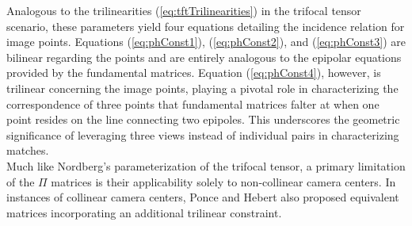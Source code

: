 Analogous to the trilinearities (\ref{eq:tftTrilinearities}) in the trifocal tensor scenario, these parameters yield four equations detailing the incidence relation for image points. Equations (\ref{eq:phConst1}), (\ref{eq:phConst2}), and (\ref{eq:phConst3}) are bilinear regarding the points and are entirely analogous to the epipolar equations provided by the fundamental matrices. Equation (\ref{eq:phConst4}), however, is trilinear concerning the image points, playing a pivotal role in characterizing the correspondence of three points that fundamental matrices falter at when one point resides on the line connecting two epipoles. This underscores the geometric significance of leveraging three views instead of individual pairs in characterizing matches.\\

Much like Nordberg's parameterization of the trifocal tensor, a primary limitation of the \( \Pi \) matrices is their applicability solely to non-collinear camera centers. In instances of collinear camera centers, Ponce and Hebert also proposed equivalent matrices incorporating an additional trilinear constraint.
